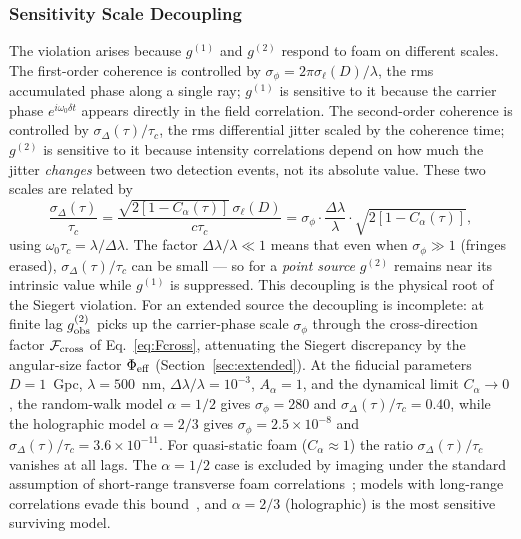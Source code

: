 \documentclass[aps,prd,onecolumn,amsmath,amssymb]{revtex4-2}
\begin{document}
\subsubsection{Sensitivity Scale Decoupling}
\label{sec:scales}

The violation arises because $g^{(1)}$ and $g^{(2)}$ respond to foam on
different scales.
The first-order coherence is controlled by $\sigma_\phi =
2\pi\sigma_\ell(D)/\lambda$, the rms accumulated phase along a single ray;
$g^{(1)}$ is sensitive to it because the carrier phase $e^{i\omega_0\delta t}$
appears directly in the field correlation.
The second-order coherence is controlled by $\sigma_\Delta(\tau)/\tau_c$,
the rms differential jitter scaled by the coherence time; $g^{(2)}$ is
sensitive to it because intensity correlations depend on how much the
jitter \emph{changes} between two detection events, not its absolute value.
These two scales are related by
\begin{equation}
  \frac{\sigma_\Delta(\tau)}{\tau_c}
  = \frac{\sqrt{2[1-C_\alpha(\tau)]}\,\sigma_\ell(D)}{c\tau_c}
  = \sigma_\phi \cdot \frac{\Delta\lambda}{\lambda}\cdot\sqrt{2[1-C_\alpha(\tau)]},
  \label{eq:ratio}
\end{equation}
using $\omega_0\tau_c = \lambda/\Delta\lambda$.
The factor $\Delta\lambda/\lambda \ll 1$ means that even when $\sigma_\phi \gg 1$
(fringes erased), $\sigma_\Delta(\tau)/\tau_c$ can be small --- so for a
\emph{point source} $g^{(2)}$ remains near its intrinsic value while
$g^{(1)}$ is suppressed.  This decoupling is the physical root of the
Siegert violation.  For an extended source the decoupling is incomplete:
at finite lag $g^{(2)}_{\rm obs}$ picks up the carrier-phase scale
$\sigma_\phi$ through the cross-direction factor $\mathcal{F}_{\rm cross}$
of Eq.~\eqref{eq:Fcross}, attenuating the Siegert discrepancy by the
angular-size factor $\Phi_{\rm eff}$ (Section~\ref{sec:extended}).
At the fiducial parameters $D=1$~Gpc, $\lambda=500$~nm,
$\Delta\lambda/\lambda=10^{-3}$, $A_\alpha=1$, and the dynamical limit
$C_\alpha\to 0$, the random-walk model $\alpha=1/2$ gives
$\sigma_\phi = 280$ and $\sigma_\Delta(\tau)/\tau_c = 0.40$, while the
holographic model $\alpha=2/3$ gives $\sigma_\phi = 2.5\times 10^{-8}$ and
$\sigma_\Delta(\tau)/\tau_c = 3.6\times 10^{-11}$.
For quasi-static foam ($C_\alpha\approx 1$) the ratio
$\sigma_\Delta(\tau)/\tau_c$ vanishes at all lags.
The $\alpha=1/2$ case is excluded by imaging under the standard assumption
of short-range transverse foam correlations~\cite{Perlman2015}; models with
long-range correlations evade this bound~\cite{LeeZurekChen2024}, and
$\alpha=2/3$ (holographic) is the most sensitive surviving model.
\end{document}
